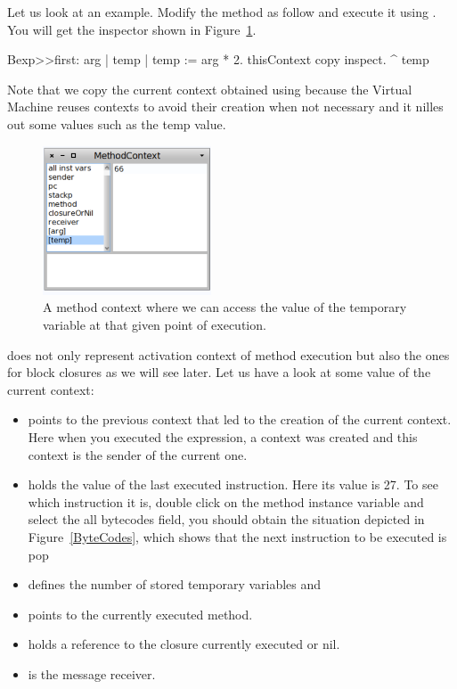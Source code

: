 \documentclass[a4paper,10pt,twoside]{book}
\begin{document}
Let us look at an example. Modify the method as follow and execute it using .
You will get the inspector shown in Figure~\ref{oneContext}.

\begin{code}
Bexp>>first: arg
	| temp |
	temp := arg * 2.
	thisContext copy inspect.
	^ temp
\end{code}

Note that we copy the current context obtained using  because the Virtual Machine reuses contexts to avoid their creation when not necessary and it nilles out some values such as the temp value.

\begin{figure}[!h]
\begin{center}\includegraphics[width=5cm]{OneContext}
\caption{A method context where we can access the value of the temporary variable  at that given point of execution.\label{oneContext}}
\end{center}
\end{figure}

 does not only represent activation context of method execution but also
the ones for block closures as we will see later. Let us have a look at some value of the current context:

\begin{itemize}
\item {} points to the previous context that led to the creation of the current context. Here when you executed the expression, a context was created and this context is the sender of the current one.

\item {} holds the value of the last executed instruction. Here its value is 27. To see which instruction it is, double click on the method instance variable and select the all bytecodes field, you should obtain the situation depicted in Figure~\ref{ByteCodes}, which shows that the next instruction to be executed is pop 

\item {} defines the number of stored temporary variables and 

\item {} points to the currently executed  method.

\item {} holds a reference to the closure currently executed or nil.

\item {} is the message receiver.
\end{itemize}
\end{document}
